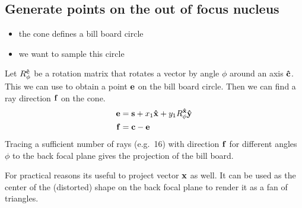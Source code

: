 \subsection{Generate points on the out of focus nucleus}
\begin{itemize}
\item the cone defines a bill board circle
\item we want to sample this circle
\end{itemize}
Let $R_\phi^{\mathbf{\hat{c}}}$ be a rotation matrix that rotates a vector by angle
$\phi$ around an axis $\mathbf{\hat{c}}$. This we can use to obtain a point $\mathbf{e}$
on the bill board circle. Then we can find a ray direction $\mathbf{f}$ on the
cone.
\begin{align}
  \mathbf{e}&=\mathbf{s}+x_1\mathbf{\hat{x}}+y_1R_\phi^{\mathbf{\hat{x}}}\mathbf{\hat{y}}\\
  \mathbf{f}&=\mathbf{c}-\mathbf{e}
\end{align}
Tracing a sufficient number of rays (e.g.\ 16) with direction $\mathbf{f}$ for
different angles $\phi$ to the back focal plane gives the projection
of the bill board.

For practical reasons its useful to project vector $\mathbf{x}$ as well. It
can be used as the center of the (distorted) shape on the back focal
plane to render it as a fan of triangles.

